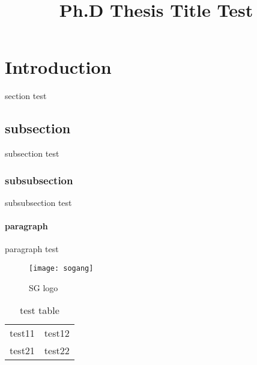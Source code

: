 \documentclass[11pt,a4paper]{article}
\title{Ph.D Thesis Title Test}
\begin{document}
\maketitle
\newpage
{}



\section{Introduction}
section test

\subsection{subsection}

subsection test

\subsubsection{subsubsection}

subsubsection test

\paragraph{paragraph}

paragraph test

\begin{figure}[htb]
\centering
\texttt{[image: sogang]}
\caption{SG logo}	%
\label{fig:sglogo}
\end{figure}


\begin{table}[htb]
\centering
\begin{tabular}{c|c}
test11 & test12 \\
test21 & test22
\end{tabular}
\caption{test table}	%
\label{tab:test}
\end{table}

\nocite{*}	%



\newpage
{}


\end{document}
